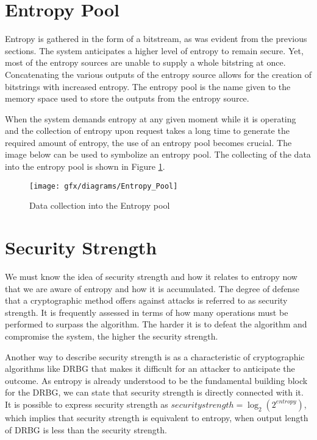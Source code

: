%
%
\section{Entropy Pool}
\label{sec:fundamentals:entropypool}
Entropy is gathered in the form of a bitstream, as was evident from the previous sections. The system anticipates a higher level of entropy to remain secure. Yet, most of the entropy sources are unable to supply a whole bitstring at once. Concatenating the various outputs of the entropy source allows for the creation of bitstrings with increased entropy. The entropy pool is the name given to the memory space used to store the outputs from the entropy source.

When the system demands entropy at any given moment while it is operating and the collection of entropy upon request takes a long time to generate the required amount of entropy, the use of an entropy pool becomes crucial. The image below can be used to symbolize an entropy pool. The collecting of the data into the entropy pool is shown in Figure \ref{fig:2:9}.
\begin{figure}[htbp]
	\centering
	\texttt{[image: gfx/diagrams/Entropy\_Pool]}
	\caption{Data collection into the Entropy pool}
	\label{fig:2:9}
\end{figure}

%
%
\section{Security Strength}
\label{sec:fundamentals:SS}
We must know the idea of security strength and how it relates to entropy now that we are aware of entropy and how it is accumulated. The degree of defense that a cryptographic method offers against attacks is referred to as security strength. It is frequently assessed in terms of how many operations must be performed to surpass the algorithm. The harder it is to defeat the algorithm and compromise the system, the higher the security strength. 

Another way to describe security strength is as a characteristic of cryptographic algorithms like DRBG that makes it difficult for an attacker to anticipate the outcome. As entropy is already understood to be the fundamental building block for the DRBG, we can state that security strength is directly connected with it. It is possible to express security strength as $security strength=\log_{2}(2^{entropy})$, which implies that security strength is equivalent to entropy, when output length of DRBG is less than the security strength.

